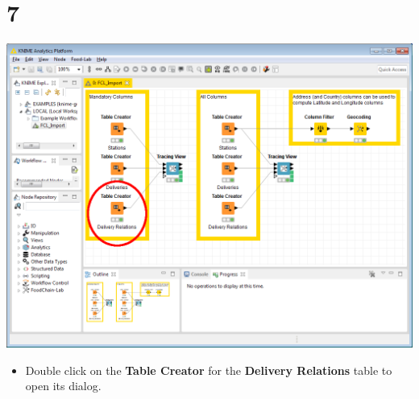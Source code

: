\documentclass[10pt]{beamer}
\begin{document}
\section{7}
\begin{frame}
	\begin{center}
  		\includegraphics[height=0.6\textheight]{7.png}
	\end{center}
	\begin{itemize}
		\item Double click on the \textbf{Table Creator} for the \textbf{Delivery Relations} table to open its dialog.
	\end{itemize}
\end{frame}
\end{document}
